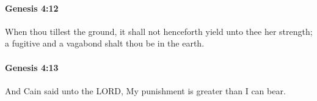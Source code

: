 		\paragraph{Genesis 4:12} %
			\label{GENESIS-4-12}

			When thou tillest the ground, it shall not henceforth yield unto thee her strength; a fugitive and a vagabond shalt thou be in the earth.


		\paragraph{Genesis 4:13} %
			\label{GENESIS-4-13}

			And Cain said unto the LORD, My punishment is greater than I can bear.


